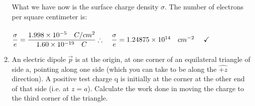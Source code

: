 \documentclass[fleqn]{article}
\begin{document}
\begin{enumerate}
{        \\
        \\
        What we have now is the surface charge density $\sigma$. The number of electrons per square centimeter is:
        \\
        \\
        $
          \dfrac{\sigma}{e}=\dfrac{1.998 \times 10^{-5} ~~~ C/cm^2}{1.60 \times 10^{-19} ~~~ C}
          \\
          \\
          \\
          \therefore ~~~ \dfrac{\sigma}{e}=1.24875 \times 10^{14} ~~~ cm^{-2} ~~~~ \checkmark
        $
        \\
      }

    \item An electric dipole $\overrightarrow{p}$ is at the origin, at one corner of an equilateral triangle of side a, pointing 
    along one side (which you can take to be along the $\hat{+z}$ direction). A positive test charge q is initially at the corner at 
    the other end of that side (i.e. at $z=a$). Calculate the work done in moving the charge to the third corner of the triangle.


\end{enumerate}
\end{document}

